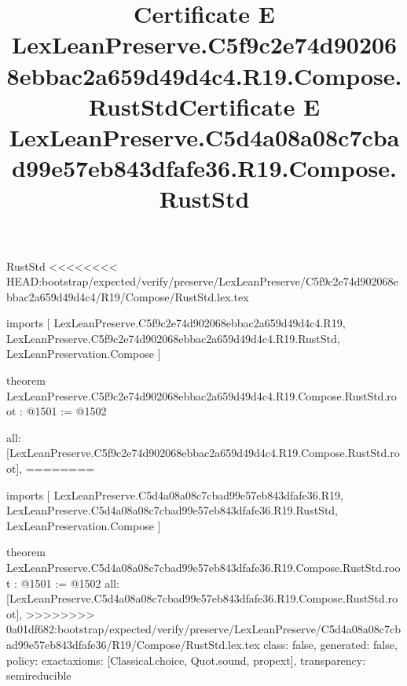 \begin{lexlean}{RustStd}
<<<<<<<< HEAD:bootstrap/expected/verify/preserve/LexLeanPreserve/C5f9c2e74d902068ebbac2a659d49d4c4/R19/Compose/RustStd.lex.tex
\title{Certificate E LexLeanPreserve.C5f9c2e74d902068ebbac2a659d49d4c4.R19.Compose.RustStd}
\begin{coremodule}
imports [
  LexLeanPreserve.C5f9c2e74d902068ebbac2a659d49d4c4.R19,
  LexLeanPreserve.C5f9c2e74d902068ebbac2a659d49d4c4.R19.RustStd,
  LexLeanPreservation.Compose
]

theorem LexLeanPreserve.C5f9c2e74d902068ebbac2a659d49d4c4.R19.Compose.RustStd.root : @1501 := @1502 {
  all: [LexLeanPreserve.C5f9c2e74d902068ebbac2a659d49d4c4.R19.Compose.RustStd.root],
========
\title{Certificate E LexLeanPreserve.C5d4a08a08c7cbad99e57eb843dfafe36.R19.Compose.RustStd}
\begin{coremodule}
imports [
  LexLeanPreserve.C5d4a08a08c7cbad99e57eb843dfafe36.R19,
  LexLeanPreserve.C5d4a08a08c7cbad99e57eb843dfafe36.R19.RustStd,
  LexLeanPreservation.Compose
]

theorem LexLeanPreserve.C5d4a08a08c7cbad99e57eb843dfafe36.R19.Compose.RustStd.root : @1501 := @1502 {
  all: [LexLeanPreserve.C5d4a08a08c7cbad99e57eb843dfafe36.R19.Compose.RustStd.root],
>>>>>>>> 0a01df682:bootstrap/expected/verify/preserve/LexLeanPreserve/C5d4a08a08c7cbad99e57eb843dfafe36/R19/Compose/RustStd.lex.tex
  class: false,
  generated: false,
  policy: exact{axioms: [Classical.choice, Quot.sound, propext]},
  transparency: semireducible
}


\end{coremodule}}
\end{coremodule}
\end{lexlean}
